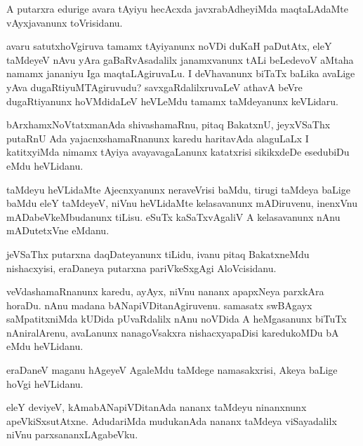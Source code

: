 \documentclass{article}
\begin{document}
\begin{mn}
A putarxra edurige avara tAyiyu hecAcxda javxrabAdheyiMda maqtaLAdaMte 
vAyxjavanunx toVrisidanu.
\end{mn}

\begin{mn}
avaru satutxhoVgiruva tamamx tAyiyanunx noVDi duKaH paDutAtx, eleY 
taMdeyeV nAvu yAra gaBaRvAsadalilx janamxvanunx tALi beLedevoV aMtaha 
namamx jananiyu Iga maqtaLAgiruvaLu. I deVhavanunx biTaTx baLika 
avaLige yAva dugaRtiyuMTAgiruvudu? savxgaRdalilxruvaLeV athavA beVre 
 dugaRtiyanunx hoVMdidaLeV heVLeMdu tamamx taMdeyanunx keVLidaru.
\end{mn}

\begin{mn}
bArxhamxNoVtatxmanAda shivashamaRnu, pitaq BakatxnU, jeyxVSaThx putaRnU 
Ada yajacnxshamaRnanunx karedu haritavAda alaguLaLx I katitxyiMda nimamx 
tAyiya avayavagaLanunx katatxrisi sikikxdeDe esedubiDu eMdu heVLidanu.
\end{mn}

\begin{mn}
taMdeyu heVLidaMte Ajecnxyanunx neraveVrisi baMdu, tirugi taMdeya 
baLige baMdu eleY taMdeyeV, niVnu heVLidaMte kelasavanunx mADiruvenu, 
inenxVnu mADabeVkeMbudanunx tiLisu. eSuTx kaSaTxvAgaliV A kelasavanunx
nAnu mADutetxVne eMdanu.            	                        
\end{mn}

\begin{mn}
jeVSaThx putarxna daqDateyanunx tiLidu, ivanu pitaq BakatxneMdu 
nishacxyisi,  eraDaneya putarxna pariVkeSxgAgi AloVcisidanu.
\end{mn}

\begin{mn}
veVdashamaRnanunx karedu, ayAyx, niVnu nananx apapxNeya parxkAra horaDu. 
nAnu madana bANapiVDitanAgiruvenu. samasatx swBAgayx saMpatitxniMda
kUDida pUvaRdalilx nAnu noVDida A heMgasanunx biTuTx  nAniralArenu, 
avaLanunx nanagoVsakxra nishacxyapaDisi  karedukoMDu bA eMdu heVLidanu.
\end{mn}

\begin{mn}
eraDaneV maganu hAgeyeV AgaleMdu taMdege namasakxrisi, Akeya baLige 
hoVgi heVLidanu.
\end{mn} 

\begin{mn}
eleY deviyeV, kAmabANapiVDitanAda nananx taMdeyu ninanxnunx
apeVkiSxsutAtxne. AdudariMda mudukanAda nananx taMdeya viSayadalilx 
niVnu  parxsananxLAgabeVku.
\end{mn} 
\end{document}
